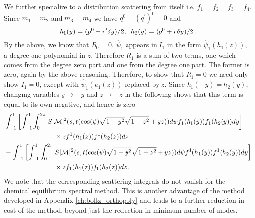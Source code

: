 We further specialize to a distribution scattering from itself i.e. $f_1=f_2=f_3=f_4$.  Since $m_1=m_2$ and $m_3=m_4$ we have $q^0=(q^{\prime})^0=0$ and
\begin{equation}
h_1(y)=(p^0-r^{\prime}\delta y)/2,\hspace{2mm} h_2(y)=(p^0+r\delta y)/2\,.
\end{equation}
 By the above, we know that $R_0=0$.  $\hat\psi_1$ appears in $I_1$ in the form $\hat\psi_1(h_1(z))$, a degree one polynomial in $z$.  Therefore $R_1$ is a sum of two terms, one which comes from the degree zero part and one from the degree one part.  The former is zero, again by the above reasoning.  Therefore, to show that $R_1=0$ we need only show $I_1=0$, except with $\hat\psi_1(h_1(z))$ replaced by  $z$.  Since $h_1(-y)=h_2(y)$, changing variables  $y\rightarrow -y$ and $z\rightarrow -z$ in the following shows that this term is equal to its own negative, and hence is zero
\begin{align}
&\int_{-1}^1 \left[\int_{-1}^1\int_0^{2\pi}S|\mathcal{M}|^2 (s,t(\cos(\psi)\sqrt{1-y^2}\sqrt{1-z^2}+yz))d\psi f_1(h_1(y))f_1(h_2(y)) dy\right] \notag\\
&\hspace{26mm}\times  zf^1(h_1(z))f^1(h_2(z))dz\\
&-\int_{-1}^1 \left[\int_{-1}^1\int_0^{2\pi}S|\mathcal{M}|^2 (s,t(\cos(\psi)\sqrt{1-y^2}\sqrt{1-z^2}+yz))d\psi f^1(h_1(y))f^1(h_2(y)) dy\right] \notag\\
&\hspace{26mm}\times zf_{1}(h_1(z))f_1(h_2(z))dz\,.\notag
\end{align}
We note that the corresponding scattering integrals do not vanish for the chemical equilibrium spectral method.  This is another advantage of the method developed in Appendix \ref{ch:boltz_orthopoly} and leads to a further reduction in cost of the method, beyond just the reduction in minimum number of modes.

